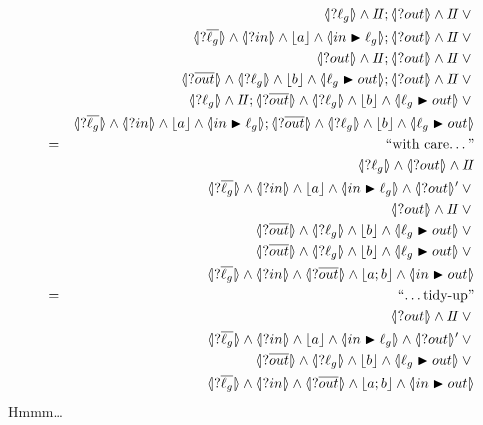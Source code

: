 \begin{eqnarray*}
  &&
     \LS{\ell_g} \land \Skip ; \LS{out} \land \Skip \lor{}
\\&& \LS{\B{\ell_g}}
           \land \LS{in} \land \ado a \land \LUPD{in}{\ell_g}
            ; \LS{out} \land \Skip\lor {}
\\&& \LS{out} \land \Skip ;\LS{out} \land \Skip\lor {}
\\&&\LS{\B{out}}
           \land \LS{\ell_g} \land \ado b \land \LUPD{\ell_g}{out}
           ; \LS{out} \land \Skip \lor {}
\\&&
     \LS{\ell_g} \land \Skip
     ; \LS{\B{out}}
       \land \LS{\ell_g} \land \ado b \land \LUPD{\ell_g}{out} \lor{}
\\&& \LS{\B{\ell_g}}
           \land \LS{in} \land \ado a \land \LUPD{in}{\ell_g}
            ; \LS{\B{out}}
       \land \LS{\ell_g} \land \ado b \land \LUPD{\ell_g}{out}
\EQ{with care\dots}
\\&&\LS{\ell_g} \land\LS{out} \land \Skip
\\&& \LS{\B{\ell_g}}
           \land \LS{in} \land \ado a \land \LUPD{in}{\ell_g}
            \land \LSd{out} \lor {}
\\&& \LS{out} \land \Skip  \lor {}
\\&&\LS{\B{out}}
           \land \LS{\ell_g} \land \ado b \land \LUPD{\ell_g}{out}
           \lor {}
\\&& \LS{\B{out}}
       \land \LS{\ell_g} \land \ado b \land \LUPD{\ell_g}{out} \lor{}
\\&& \LS{\B{\ell_g}} \land \LS{in} \land \LS{\B{out}}
    \land \ado{a;b}\land \LUPD{in}{out}
\EQ{\ldots tidy-up}
\\&& \LS{out} \land \Skip \lor {}
\\&& \LS{\B{\ell_g}}
           \land \LS{in} \land \ado a \land \LUPD{in}{\ell_g}
            \land \LSd{out} \lor {}
\\&& \LS{\B{out}}
       \land \LS{\ell_g} \land \ado b \land \LUPD{\ell_g}{out} \lor{}
\\&& \LS{\B{\ell_g}} \land \LS{in} \land \LS{\B{out}}
    \land \ado{a;b}\land \LUPD{in}{out}
\end{eqnarray*} Hmmm\dots

